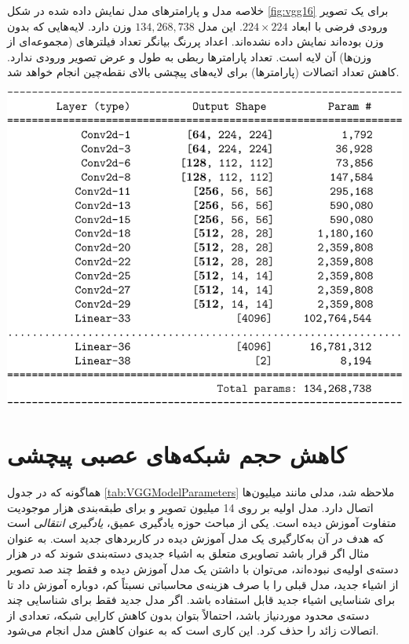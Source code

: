 \documentclass[11pt, twoside]{imsproc}
\let\LTRfootnote\footnoteA
\begin{document}
\begin{table}[t]
\caption{
خلاصه مدل و پارامترهای مدل
نمایش داده شده در شکل
\ref{fig:vgg16}
برای یک تصویر ورودی فرضی با ابعاد
$224\times 224$.
این مدل
$134,268,738$
وزن دارد.
لایه‌هایی که بدون وزن بوده‌اند نمایش داده نشده‌اند.
اعداد پررنگ بیانگر تعداد فیلترهای (مجموعه‌ای از وزن‌ها) آن لایه است.
تعداد پارامترها ربطی به طول و عرض تصویر ورودی ندارد.
کاهش تعداد اتصالات (پارامترها) برای لایه‌های پیچشی بالای نقطه‌چین انجام خواهد شد.
}
\label{tab:VGGModelParameters}
\includegraphics[width=.7\linewidth]{images/VGG16ModelParameters}
\end{table}






\section{
کاهش حجم شبکه‌های عصبی پیچشی}
\label{sec:model_size_reduction}
هما‌گونه که در جدول
\ref{tab:VGGModelParameters}
 ملاحظه شد، مدلی مانند
میلیون‌ها اتصال دارد. مدل اولیه بر روی 14 میلیون تصویر و برای طبقه‌بندی هزار موجودیت متفاوت آموزش دیده است. یکی از  مباحث حوزه یادگیری عمیق،
\textit{یادگیری انتقالی}%
\LTRfootnote{Transfer Learning}
است که هدف در آن به‌کارگیری یک مدل آموزش دیده در کاربردهای جدید است. به عنوان مثال اگر قرار باشد تصاویری متعلق به اشیاء جدیدی دسته‌بندی شوند که در هزار دسته‌ی اولیه‌ی
نبوده‌اند، می‌توان با داشتن یک مدل آموزش دیده و فقط چند صد تصویر از اشیاء جدید، مدل قبلی را با صرف هزینه‌ی محاسباتی نسبتاً کم، دوباره آموزش داد تا  برای  شناسایی اشیاء جدید قابل استفاده باشد.
اگر مدل جدید فقط برای شناسایی چند دسته‌ی محدود موردنیاز باشد، احتمالاً بتوان بدون کاهش کارایی شبکه، تعدادی از اتصالات زائد%
\LTRfootnote{Redundant}
را حذف کرد.
این کاری است که به عنوان کاهش مدل انجام می‌شود.
\end{document}
